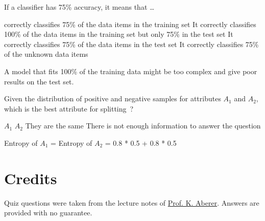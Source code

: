 \documentclass[12pt,a4paper]{exam} %
\newcommand{\staff}{\href{http://people.epfl.ch//karl.aberer}{Prof. K. Aberer}}
\begin{document}
\begin{flushleft}
\begin{multicols*}{2}
\begin{questions}
\question If a classifier has 75\% accuracy, it means that \ldots
\begin{checkboxes}
\choice correctly classifies 75\% of the data items in the training set
\choice It correctly classifies 100\% of the data items in the training set but only 75\% in the test set
\CorrectChoice It correctly classifies 75\% of the data items in the test set
\choice It correctly classifies 75\% of the unknown data items
\end{checkboxes}
\begin{solution}
A model that fits 100\% of the training data might be too complex and give poor results on the test set.
\end{solution}

\question Given the distribution of positive and negative samples for attributes $A_1$ and $A_2$, which is the best attribute for splitting~?
\begin{checkboxes}
\choice $A_1$
\choice $A_2$
\choice They are the same
\choice There is not enough information to answer the question
\end{checkboxes}
\begin{solution}
Entropy of $A_1$ =  
Entropy of $A_2$ = 0.8 * 0.5 + 0.8 * 0.5
\end{solution}

\end{questions}
\end{multicols*}
\end{flushleft}


\section*{Credits}
Quiz questions were taken from the lecture notes of \staff. Answers are provided with no guarantee.%

%
\end{document}
